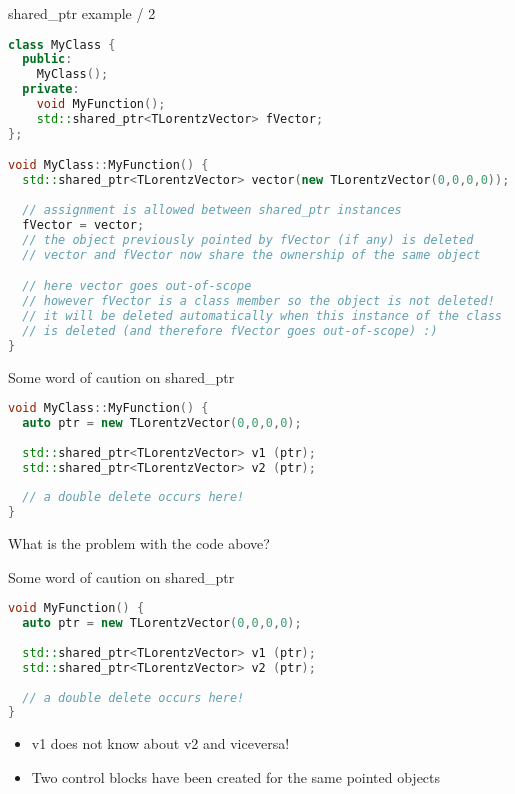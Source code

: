 \documentclass[xcolor={usenames,dvipsnames}]{beamer}
\begin{document}
\begin{frame}[fragile]{shared\_ptr example / 2}
\scriptsize
\begin{lstlisting}[language=C++]
class MyClass {
  public:
    MyClass();
  private:
    void MyFunction();
    std::shared_ptr<TLorentzVector> fVector;
};

void MyClass::MyFunction() {
  std::shared_ptr<TLorentzVector> vector(new TLorentzVector(0,0,0,0));
  
  // assignment is allowed between shared_ptr instances
  fVector = vector;
  // the object previously pointed by fVector (if any) is deleted
  // vector and fVector now share the ownership of the same object

  // here vector goes out-of-scope
  // however fVector is a class member so the object is not deleted!
  // it will be deleted automatically when this instance of the class
  // is deleted (and therefore fVector goes out-of-scope) :)
}
\end{lstlisting}
\end{frame}

\begin{frame}[fragile]{Some word of caution on shared\_ptr}
\scriptsize
\begin{lstlisting}[language=C++]
void MyClass::MyFunction() {
  auto ptr = new TLorentzVector(0,0,0,0);
  
  std::shared_ptr<TLorentzVector> v1 (ptr);
  std::shared_ptr<TLorentzVector> v2 (ptr);
  
  // a double delete occurs here!
}
\end{lstlisting}
\begin{center}
\small
What is the problem with the code above?
\end{center}
\end{frame}

\begin{frame}[fragile]{Some word of caution on shared\_ptr}
\scriptsize
\begin{lstlisting}[language=C++]
void MyFunction() {
  auto ptr = new TLorentzVector(0,0,0,0);
  
  std::shared_ptr<TLorentzVector> v1 (ptr);
  std::shared_ptr<TLorentzVector> v2 (ptr);
  
  // a double delete occurs here!
}
\end{lstlisting}
\small
\begin{itemize}
\item v1 does not know about v2 and viceversa!
\item Two control blocks have been created for the same pointed objects
\end{itemize}
\end{frame}
\end{document}
